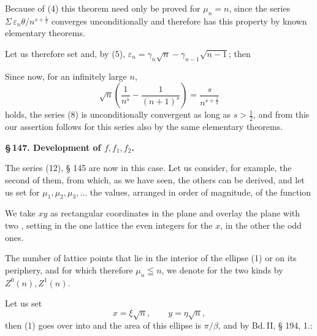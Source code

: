 
Because of (4) this theorem need only be proved for
$\mu_n = n$, since the series $\Sigma\, \varepsilon_n\theta/n^{s+\frac{1}{2}}$ converges unconditionally and
therefore has this property by known elementary theorems.

Let us therefore set
and, by (5), $\varepsilon_n = \gamma_n\sqrt{n} - \gamma_{n-1}\sqrt{n-1}$; then

Since now, for an infinitely large $n$,
\[
\sqrt{n}\left(\frac{1}{n^s} - \frac{1}{(n+1)^s}\right) = \frac{s}{n^{s+\frac{1}{2}}}
\]
holds, the series (8) is unconditionally convergent as long as $s > \frac{1}{2}$,
and from this our assertion follows for this series also
by the same elementary theorems.

\begin{center}\textbf{\S\,147. Development of $f, f_1, f_2$.}\end{center}

The series (12), § 145 are now in this case. Let us consider,
for example, the second of them, from which, as we have
seen, the others can be derived, and let us set for
$\mu_1, \mu_2, \mu_3, \ldots$ the values, arranged in order of magnitude, of the function

We take $xy$ as rectangular coordinates in the plane
and overlay the plane with two , setting in the
one lattice the even integers for the $x$, in the other the odd
ones.

The number of lattice points that lie in the interior of the ellipse (1)
or on its periphery, and for which therefore $\mu_n \leqq n$, we denote for the two kinds by $Z^0(n), Z^1(n)$.

Let us set
\[
x = \xi\sqrt{n}, \qquad y = \eta\sqrt{n},
\]
then (1) goes over into
and the area of this ellipse is $\pi/\beta$, and by Bd.\,II,
§ 194, 1.:
